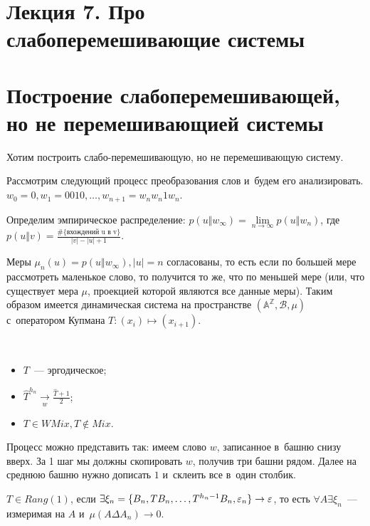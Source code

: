 \documentclass{article}
\begin{document}
\section*{Лекция 7. Про слабоперемешивающие системы}
\resetcntrs

\section{Построение слабоперемешивающей, но не перемешивающией системы}

Хотим построить слабо-перемешивающую, но не перемешивающую систему.

Рассмотрим следующий процесс преобразования слов и~будем его анализировать.
$w_0 = 0, w_1 = 0010, \ldots, w_{n+1} = w_n w_n 1 w_n$.

Определим эмпирическое распределение: $p(u \Vert w_\infty) =
\lim\limits_{n \rightarrow \infty} p(u \Vert w_n)$, где
$p(u \Vert v) = \frac{\#\{\text{вхождений u в~v}\}}{|v| - |u| + 1}$.

\begin{lemma}
	Меры $\mu_n(u) = p(u \Vert w_\infty), |u| = n$ согласованы, то есть если по
	большей мере рассмотреть маленькое слово, то получится то же, что по меньшей
	мере (или, что существует мера $\mu$, проекцией которой являются все данные
	меры). Таким образом имеется динамическая система на пространстве
	$(\mathbb{A}^\mathbb{Z}, \mathcal{B}, \mu)$ с~оператором Купмана $T: (x_i)
	\mapsto (x_{i+1})$.
\end{lemma}

\begin{theorem}~\\
	\begin{itemize}
		\item $T$~--- эргодическое;
		\item $\hat T^{h_n} \underset{w}\rightarrow \frac{\hat T + 1}{2}$;
		\item $T \in WMix, T \notin Mix$.
	\end{itemize}
\end{theorem}

Процесс можно представить так: имеем слово $w$, записанное в~башню снизу вверх.
За 1 шаг мы должны скопировать $w$, получив три башни рядом. Далее на среднюю
башню нужно дописать $1$ и~склеить все в~один столбик.

\begin{definition}
	$T \in Rang(1)$, если $\exists \xi_n = \{B_n, TB_n, \ldots, T^{h_n-1}B_n,
	\varepsilon_n\} \rightarrow \varepsilon$, то есть $\forall A \exists \xi_n$~--- измеримая на
	$A$ и~$\mu(A \Delta A_n) \rightarrow 0$.
\end{definition}
\end{document}
